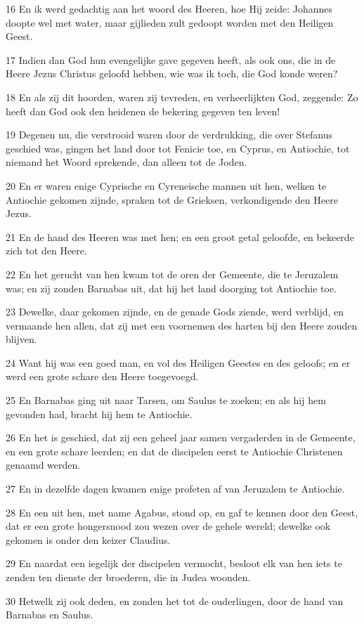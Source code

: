 \par 16 En ik werd gedachtig aan het woord des Heeren, hoe Hij zeide: Johannes doopte wel met water, maar gijlieden zult gedoopt worden met den Heiligen Geest.
\par 17 Indien dan God hun evengelijke gave gegeven heeft, als ook ons, die in de Heere Jezus Christus geloofd hebben, wie was ik toch, die God konde weren?
\par 18 En als zij dit hoorden, waren zij tevreden, en verheerlijkten God, zeggende: Zo heeft dan God ook den heidenen de bekering gegeven ten leven!
\par 19 Degenen nu, die verstrooid waren door de verdrukking, die over Stefanus geschied was, gingen het land door tot Fenicie toe, en Cyprus, en Antiochie, tot niemand het Woord sprekende, dan alleen tot de Joden.
\par 20 En er waren enige Cyprische en Cyreneische mannen uit hen, welken te Antiochie gekomen zijnde, spraken tot de Grieksen, verkondigende den Heere Jezus.
\par 21 En de hand des Heeren was met hen; en een groot getal geloofde, en bekeerde zich tot den Heere.
\par 22 En het gerucht van hen kwam tot de oren der Gemeente, die te Jeruzalem was; en zij zonden Barnabas uit, dat hij het land doorging tot Antiochie toe.
\par 23 Dewelke, daar gekomen zijnde, en de genade Gods ziende, werd verblijd, en vermaande hen allen, dat zij met een voornemen des harten bij den Heere zouden blijven.
\par 24 Want hij was een goed man, en vol des Heiligen Geestes en des geloofs; en er werd een grote schare den Heere toegevoegd.
\par 25 En Barnabas ging uit naar Tarsen, om Saulus te zoeken; en als hij hem gevonden had, bracht hij hem te Antiochie.
\par 26 En het is geschied, dat zij een geheel jaar samen vergaderden in de Gemeente, en een grote schare leerden; en dat de discipelen eerst te Antiochie Christenen genaamd werden.
\par 27 En in dezelfde dagen kwamen enige profeten af van Jeruzalem te Antiochie.
\par 28 En een uit hen, met name Agabus, stond op, en gaf te kennen door den Geest, dat er een grote hongersnood zou wezen over de gehele wereld; dewelke ook gekomen is onder den keizer Claudius.
\par 29 En naardat een iegelijk der discipelen vermocht, besloot elk van hen iets te zenden ten dienste der broederen, die in Judea woonden.
\par 30 Hetwelk zij ook deden, en zonden het tot de ouderlingen, door de hand van Barnabas en Saulus.

